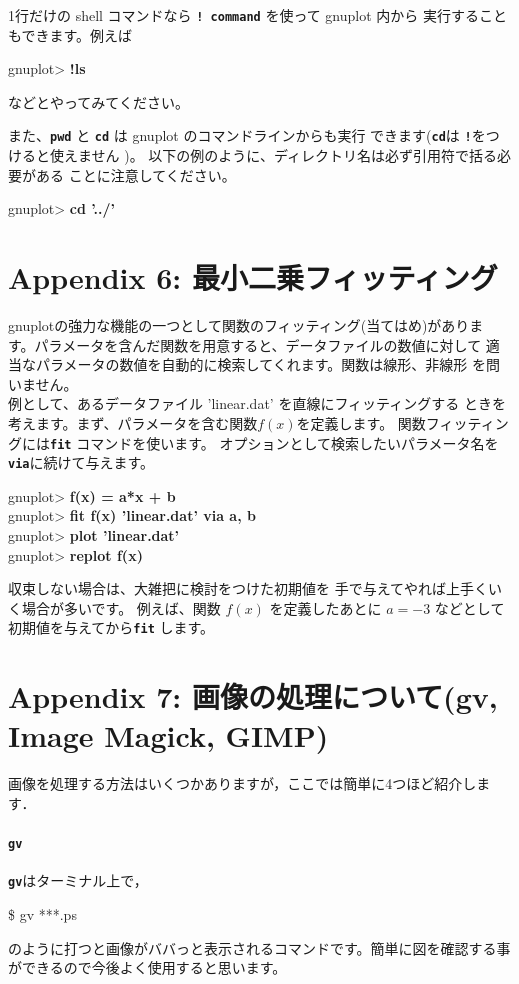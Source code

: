 \documentclass[a4j]{ujarticle} %
\newenvironment{terminal}{%
  \begin{center}
   \begin{minipage}{.8\textwidth}
    \setlength{\FrameSep}{.5\FrameSep}%
    \begin{framed}\ttfamily\small%
     \setlength\baselineskip{.85\baselineskip}%
}{%
    \end{framed}
   \end{minipage}
  \end{center}%
}
\begin{document}
1行だけの shell コマンドなら {\tt\bf ! command} を使って gnuplot 内から
実行することもできます。例えば
\begin{terminal}
 gnuplot> {\bf !ls}
\end{terminal}
などとやってみてください。

また、{\tt\bf pwd} と {\tt\bf cd} は gnuplot のコマンドラインからも実行
できます({\tt\bf cd}は {\tt\bf !}をつけると使えません )。
以下の例のように、ディレクトリ名は必ず引用符で括る必要がある
ことに注意してください。
\begin{terminal}
 gnuplot> {\bf cd '../'}
\end{terminal}

\section*{Appendix 6:  最小二乗フィッティング}
gnuplotの強力な機能の一つとして関数のフィッティング(当てはめ)がありま
す。パラメータを含んだ関数を用意すると、データファイルの数値に対して
適当なパラメータの数値を自動的に検索してくれます。関数は線形、非線形
を問いません。\\

例として、あるデータファイル 'linear.dat' を直線にフィッティングする
ときを考えます。まず、パラメータを含む関数$f(x)$を定義します。
関数フィッティングには{\tt\bf fit} コマンドを使います。
オプションとして検索したいパラメータ名を {\tt\bf via}に続けて与えます。

\begin{terminal}
 gnuplot> {\bf f(x) = a*x + b}\\
 gnuplot> {\bf fit f(x) 'linear.dat' via a, b}\\
 gnuplot> {\bf plot 'linear.dat'}\\
 gnuplot> {\bf replot f(x)}
\end{terminal}

収束しない場合は、大雑把に検討をつけた初期値を
手で与えてやれば上手くいく場合が多いです。
例えば、関数 $f(x)$ を定義したあとに
$a = -3$ などとして初期値を与えてから{\tt\bf fit} します。

\section*{Appendix 7:  画像の処理について(gv, Image Magick, GIMP)}
画像を処理する方法はいくつかありますが，ここでは簡単に4つほど紹介します．

\paragraph{{\tt\bf gv}}
{\tt\bf gv}はターミナル上で，
\begin{terminal}
\$ gv ***.ps
\end{terminal}
のように打つと画像がババっと表示されるコマンドです。簡単に図を確認する事ができるので今後よく使用すると思います。
\end{document}

